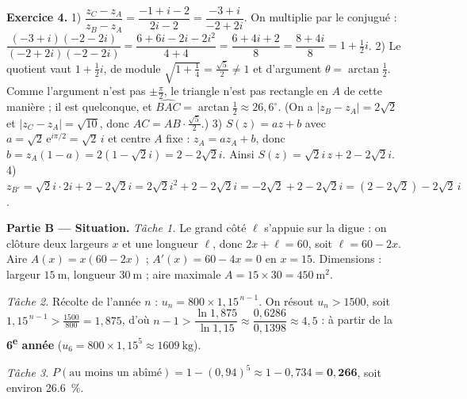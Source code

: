 \noindent\textbf{Exercice 4.}
1) $\dfrac{z_C-z_A}{z_B-z_A}=\dfrac{-1+i-2}{2i-2}=\dfrac{-3+i}{-2+2i}$.
On multiplie par le conjugué : $\dfrac{(-3+i)(-2-2i)}{(-2+2i)(-2-2i)}=\dfrac{6+6i-2i-2i^2}{4+4}=\dfrac{6+4i+2}{8}=\dfrac{8+4i}{8}=1+\tfrac12 i$.
2) Le quotient vaut $1+\frac12 i$, de module $\sqrt{1+\frac14}=\frac{\sqrt5}{2}\ne1$ et d'argument
$\theta=\arctan\frac12$. Comme l'argument n'est pas $\pm\frac\pi2$, le triangle n'est pas rectangle
en $A$ de cette manière ; il est quelconque, et $\widehat{BAC}=\arctan\tfrac12\approx26{,}6^\circ$.
(On a $|z_B-z_A|=2\sqrt2$ et $|z_C-z_A|=\sqrt{10}$, donc $AC=AB\cdot\frac{\sqrt5}{2}$.)
3) $S(z)=a z+b$ avec $a=\sqrt2\,\mathrm{e}^{i\pi/2}=\sqrt2\,i$ et centre $A$ fixe : $z_A=a z_A+b$, donc
$b=z_A(1-a)=2(1-\sqrt2 i)=2-2\sqrt2 i$. Ainsi $S(z)=\sqrt2 i\,z+2-2\sqrt2 i$.
4) $z_{B'}=\sqrt2 i\cdot 2i+2-2\sqrt2 i=2\sqrt2 i^2+2-2\sqrt2 i=-2\sqrt2+2-2\sqrt2 i
=(2-2\sqrt2)-2\sqrt2\, i$.

\smallskip
\noindent\textbf{Partie B — Situation.}
\emph{Tâche 1.} Le grand côté $\ell$ s'appuie sur la digue : on clôture deux largeurs $x$ et une
longueur $\ell$, donc $2x+\ell=60$, soit $\ell=60-2x$. Aire $A(x)=x(60-2x)$ ;
$A'(x)=60-4x=0$ en $x=15$. Dimensions : largeur $\SI{15}{\metre}$, longueur $\SI{30}{\metre}$ ;
aire maximale $A=15\times30=\SI{450}{\metre\squared}$.

\emph{Tâche 2.} Récolte de l'année $n$ : $u_n=800\times1{,}15^{\,n-1}$. On résout $u_n>1500$,
soit $1{,}15^{\,n-1}>\frac{1500}{800}=1{,}875$, d'où $n-1>\dfrac{\ln1{,}875}{\ln1{,}15}\approx\dfrac{0{,}6286}{0{,}1398}\approx4{,}5$ :
à partir de la \textbf{6\textsuperscript{e} année} ($u_6=800\times1{,}15^5\approx\SI{1609}{\kilogram}$).

\emph{Tâche 3.} $P(\text{au moins un abîmé})=1-(0{,}94)^5\approx1-0{,}734=\mathbf{0{,}266}$, soit environ \SI{26,6}{\percent}.
